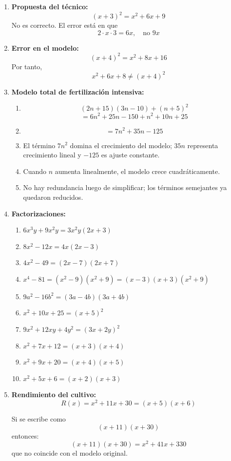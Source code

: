 \documentclass[12pt]{article}
\begin{document}
\begin{enumerate}
	\item \textbf{Propuesta del técnico:}
	\[
	(x+3)^2=x^2+6x+9
	\]
	No es correcto. El error está en que
	\[
	2\cdot x\cdot 3=6x,\quad \text{no } 9x
	\]
	
	\item \textbf{Error en el modelo:}
	\[
	(x+4)^2=x^2+8x+16
	\]
	Por tanto,
	\[
	x^2+6x+8\neq (x+4)^2
	\]
	
	\item \textbf{Modelo total de fertilización intensiva:}
	\begin{enumerate}[label=\alph*)]
		\item
		\[
		(2n+15)(3n-10)+(n+5)^2
		\]
		\[
		=6n^2+25n-150+n^2+10n+25
		\]
		
		\item
		\[
		=7n^2+35n-125
		\]
		
		\item El término $7n^2$ domina el crecimiento del modelo; $35n$ representa crecimiento lineal y $-125$ es ajuste constante.
		
		\item Cuando $n$ aumenta linealmente, el modelo crece cuadráticamente.
		
		\item No hay redundancia luego de simplificar; los términos semejantes ya quedaron reducidos.
	\end{enumerate}
	
	\item \textbf{Factorizaciones:}
	\begin{enumerate}[label=\alph*)]
		\item $6x^3y+9x^2y=3x^2y(2x+3)$
		\item $8x^2-12x=4x(2x-3)$
		\item $4x^2-49=(2x-7)(2x+7)$
		\item $x^4-81=(x^2-9)(x^2+9)=(x-3)(x+3)(x^2+9)$
		\item $9a^2-16b^2=(3a-4b)(3a+4b)$
		\item $x^2+10x+25=(x+5)^2$
		\item $9x^2+12xy+4y^2=(3x+2y)^2$
		\item $x^2+7x+12=(x+3)(x+4)$
		\item $x^2+9x+20=(x+4)(x+5)$
		\item $x^2+5x+6=(x+2)(x+3)$
	\end{enumerate}
	
	\item \textbf{Rendimiento del cultivo:}
	\[
	R(x)=x^2+11x+30=(x+5)(x+6)
	\]
	
	Si se escribe como
	\[
	(x+11)(x+30)
	\]
	entonces:
	\[
	(x+11)(x+30)=x^2+41x+330
	\]
	que no coincide con el modelo original.
	
\end{enumerate}
\end{document}
